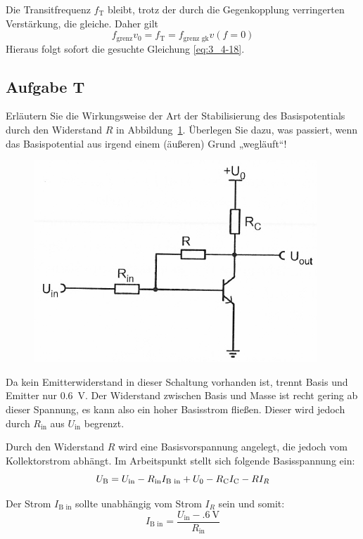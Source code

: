 Die Transitfrequenz $f_\text{T}$ bleibt, trotz der durch die Gegenkopplung
verringerten Verstärkung, die gleiche. Daher gilt
\[f_\text{grenz}v_0 = f_\text{T} = f_\text{grenz gk} v(f=0)\]
Hieraus folgt sofort die gesuchte Gleichung \eqref{eq:3_4-18}.

\FloatBarrier
\subsection{Aufgabe T}

\begin{problem}
    Erläutern Sie die Wirkungsweise der Art der Stabilisierung des
    Basispotentials durch den Widerstand $R$ in Abbildung~\ref{fig:3_4-16}.
    Überlegen Sie dazu, was passiert, wenn das Basispotential aus irgend einem
    (äußeren) Grund „wegläuft“!
\end{problem}

\begin{figure}[htbp]
    \centering
    \includegraphics[width=.6\textwidth]{Anleitung/3_4-16.png}
    \caption{%
        \cite[Abbildung~3/4.16]{physik313-Anleitung}
    }
    \label{fig:3_4-16}
\end{figure}

Da kein Emitterwiderstand in dieser Schaltung vorhanden ist, trennt Basis und
Emitter nur \SI{.6}{\volt}. Der Widerstand zwischen Basis und Masse ist recht
gering ab dieser Spannung, es kann also ein hoher Basisstrom fließen. Dieser
wird jedoch durch $R_\text{in}$ aus $U_\text{in}$ begrenzt.

Durch den Widerstand $R$ wird eine Basisvorspannung angelegt, die jedoch vom
Kollektorstrom abhängt. Im Arbeitspunkt stellt sich folgende Basisspannung ein:
\[
    U_\text{B} = U_\text{in} - R_\text{in} I_\text{B in}
    + U_0 - R_\text{C} I_\text{C} - R I_R
\]

Der Strom $I_\text{B in}$ sollte unabhängig vom Strom $I_R$ sein und somit:
\[
    I_\text{B in} = \frac{U_\text{in} - \SI{.6}\volt}{R_\text{in}}
\]

